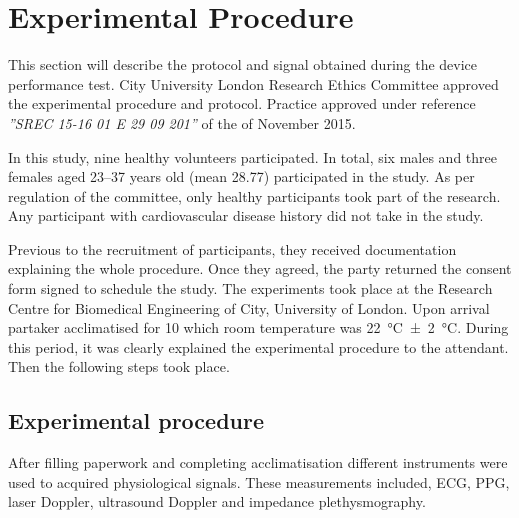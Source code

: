 
\chapter{Experimental Procedure}  %

\ifpdf
    \graphicspath{{Chapter4/Figs/Raster/}{Chapter4/Figs/PDF/}{Chapter4/Figs/}}
\else
    \graphicspath{{Chapter4/Figs/Vector/}{Chapter4/Figs/}}
\fi


This section will describe the protocol and signal obtained during the device performance test. City University London Research Ethics Committee approved the experimental procedure and protocol. Practice approved under reference \textit{''SREC 15-16 01 E 29 09 201''} of the  of November 2015. 

In this study, nine healthy volunteers participated. In total, six males and three females aged \numrange{23}{37} years old (mean 28.77) participated in the study. As per regulation of the committee, only healthy participants took part of the research. Any participant with cardiovascular disease history did not take in the study. 

Previous to the recruitment of participants, they received documentation explaining the whole procedure. Once they agreed, the party returned the consent form signed to schedule the study. The experiments took place at the Research Centre for Biomedical Engineering of City, University of London. Upon arrival partaker acclimatised for \SI{10}{\min} which room temperature was \SI{22}{\degreeCelsius}\SI{\pm 2}{\degreeCelsius}. During this period, it was clearly explained the experimental procedure to the attendant. Then the following steps took place.


\section{Experimental procedure} %
\label{section4.1}

After filling paperwork and completing acclimatisation different instruments were used to acquired physiological signals. These measurements included, ECG, PPG, laser Doppler, ultrasound Doppler and impedance plethysmography. 


